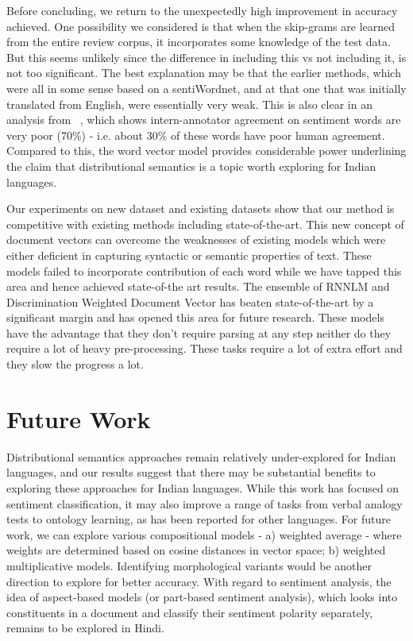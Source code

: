 \documentclass[11pt,a4paper]{article}
\begin{document}
Before concluding, we return to the unexpectedly high improvement in accuracy achieved. One possibility we considered is that when the skip-grams are learned from the entire review corpus, it incorporates some knowledge of the test data.  But this seems unlikely since the difference in including this vs not including it, is not too significant.  The best explanation may be that the earlier methods, which were all in some sense based on a sentiWordnet, and at that one that was initially translated from English, were essentially very weak.  This is also clear in an analysis from
~\cite{Bakliwal:12}, which shows intern-annotator agreement on sentiment words are very poor (70\%) - i.e. about 30\% of these words have poor human agreement. Compared to this, the word vector model  
provides considerable power underlining the claim that distributional semantics is a topic worth exploring for Indian languages.

Our experiments on new dataset and existing datasets show that our method is competitive with existing methods including state-of-the-art. This new concept of document vectors can overcome the weaknesses of existing models which were either deficient in capturing syntactic or semantic properties of text. These models failed to incorporate contribution of each word while we have tapped this area and hence achieved state-of-the art results. The ensemble of RNNLM and Discrimination Weighted Document Vector has beaten state-of-the-art by a significant margin and has opened this area for future research. These models have the advantage that they don't require parsing at any step neither do they require a lot of heavy pre-processing. These tasks require a lot of extra effort and they slow the progress a lot.

\section{Future Work}
\label{sec:future_work}
Distributional semantics approaches remain relatively under-explored for Indian languages, and our results suggest that there may be substantial benefits to exploring these approaches for Indian languages.  While this work has focused on sentiment classification, it may also improve a range of tasks from verbal analogy tests to ontology learning, as has been reported for other languages.
For future work, we can explore various compositional models - a) weighted average - where weights are determined based on cosine distances in vector space;  b) weighted multiplicative models. Identifying morphological variants would be another direction to explore for better accuracy. With regard to sentiment analysis, the idea of aspect-based models (or part-based sentiment analysis), which looks into constituents in a document and classify their sentiment polarity separately, remains to be explored in Hindi.
\end{document}

